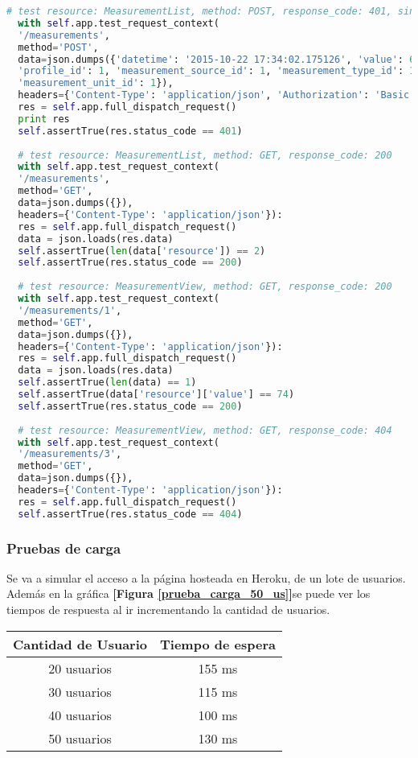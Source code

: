 \begin{lstlisting}[language=Python ]
  # test resource: MeasurementList, method: POST, response_code: 401, sin autorizacion, token invalido
  with self.app.test_request_context(
  '/measurements',
  method='POST',
  data=json.dumps({'datetime': '2015-10-22 17:34:02.175126', 'value': 68, 'analysis_id': 1,
  'profile_id': 1, 'measurement_source_id': 1, 'measurement_type_id': 1,
  'measurement_unit_id': 1}),
  headers={'Content-Type': 'application/json', 'Authorization': 'Basic ' + token_a}):
  res = self.app.full_dispatch_request()
  print res
  self.assertTrue(res.status_code == 401)
  
  # test resource: MeasurementList, method: GET, response_code: 200
  with self.app.test_request_context(
  '/measurements',
  method='GET',
  data=json.dumps({}),
  headers={'Content-Type': 'application/json'}):
  res = self.app.full_dispatch_request()
  data = json.loads(res.data)
  self.assertTrue(len(data['resource']) == 2)
  self.assertTrue(res.status_code == 200)
  
  # test resource: MeasurementView, method: GET, response_code: 200
  with self.app.test_request_context(
  '/measurements/1',
  method='GET',
  data=json.dumps({}),
  headers={'Content-Type': 'application/json'}):
  res = self.app.full_dispatch_request()
  data = json.loads(res.data)
  self.assertTrue(len(data) == 1)
  self.assertTrue(data['resource']['value'] == 74)
  self.assertTrue(res.status_code == 200)
  
  # test resource: MeasurementView, method: GET, response_code: 404
  with self.app.test_request_context(
  '/measurements/3',
  method='GET',
  data=json.dumps({}),
  headers={'Content-Type': 'application/json'}):
  res = self.app.full_dispatch_request()
  self.assertTrue(res.status_code == 404)
  \end{lstlisting}
  
  \subsubsection{Pruebas de carga}
  Se va a simular el acceso a la página hosteada en Heroku, de un lote de usuarios. Además en la gráfica \textbf{[Figura \ref{prueba_carga_50_us}]}se puede ver los tiempos de respuesta al ir incrementando la cantidad de usuarios.
  
  \begin{center}
  	\begin{tabular}{|c|c|}
  		\hline Cantidad de Usuario  &  Tiempo de espera\\ 
  		\hline 20 usuarios &  155 ms \\ 
  		\hline 30 usuarios  & 115 ms \\ 
  		\hline 40 usuarios  & 100 ms \\ 
  		\hline 50 usuarios  & 130 ms \\ 	
  		\hline 
  	\end{tabular} 
  \end{center}
  
